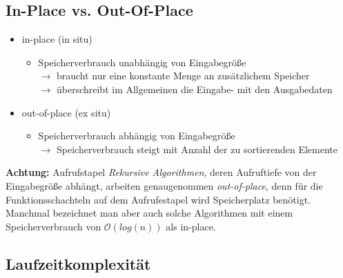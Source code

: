\documentclass{lehramt-informatik-haupt}
\begin{document}
%

\subsection{In-Place vs. Out-Of-Place}

\begin{itemize}

%

\item in-place (in situ)

\begin{itemize}
\item Speicherverbrauch unabhängig von Eingabegröße\\
%
$\rightarrow$ braucht nur eine konstante Menge an zusätzlichem
Speicher\\
%
$\rightarrow$ überschreibt im Allgemeinen die Eingabe- mit den
Ausgabedaten
\end{itemize}

%

\item out-of-place (ex situ)

\begin{itemize}
\item Speicherverbrauch abhängig von Eingabegröße\\
%
$\rightarrow$ Speicherverbrauch steigt mit Anzahl der zu sortierenden
Elemente
\end{itemize}

\end{itemize}

\noindent
\textbf{Achtung:} Aufrufstapel  \emph{Rekursive Algorithmen}, deren
Aufruftiefe von der Eingabegröße abhängt, arbeiten genaugenommen
\emph{out-of-place}, denn für die Funktionsschachteln auf dem
Aufrufestapel wird Speicherplatz benötigt. Manchmal bezeichnet man aber
auch solche Algorithmen mit einem Speicherverbrauch von
$\mathcal{O}(log(n))$ als in-place.

%

\subsection{Laufzeitkomplexität}
\end{document}
